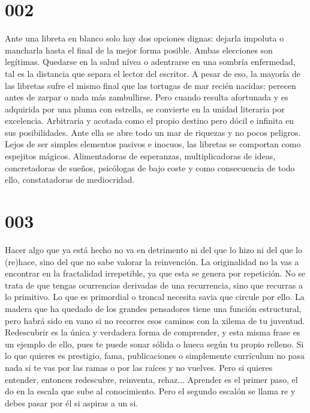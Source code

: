 \documentclass[a4paper,11pt,openright,twocolumn]{book}
\begin{document}
\section*{002}

Ante una libreta en blanco solo hay dos opciones dignas: dejarla impoluta o mancharla hasta el final de la mejor forma 
posible. Ambas elecciones son legítimas. Quedarse en la salud nívea o adentrarse en una sombría enfermedad, tal es la distancia que separa el lector del escritor. A pesar de eso, la mayoría de las libretas sufre el mismo final que las tortugas de mar recién nacidas: perecen antes de zarpar o nada más zambullirse. Pero cuando resulta afortunada y es adquirida por una pluma con estrella, se convierte en la unidad literaria por excelencia. Arbitraria y acotada como el propio destino pero dócil e infinita en sus posibilidades. Ante ella se abre todo un mar de riquezas y no pocos peligros. Lejos de ser simples elementos pasivos e inocuos, las libretas se comportan como espejitos mágicos. Alimentadoras de esperanzas, multiplicadoras de ideas, concretadoras de sueños, psicólogas de bajo coste y como consecuencia de todo ello, constatadoras de mediocridad.

\section*{003}

Hacer algo que ya está hecho no va en detrimento ni del que lo hizo ni del que lo (re)hace, sino del que no sabe valorar 
la reinvención. La originalidad no la vas a encontrar en la fractalidad irrepetible, ya que esta se genera por repetición. No se trata de que tengas ocurrencias derivadas de una recurrencia, sino que recurras a lo primitivo. Lo que es primordial o troncal necesita savia que circule por ello. La madera que ha quedado de los grandes pensadores tiene una función estructural, pero habrá sido en vano si no recorres esos caminos con la xilema de tu juventud. Redescubrir es la única y verdadera forma de comprender, y esta misma frase es un ejemplo de ello, pues te puede sonar sólida o hueca según tu propio relleno. Si lo que quieres es prestigio, fama, publicaciones o simplemente currículum no pasa nada si te vas por las ramas o por las raíces y no vuelves. Pero si quieres entender, entonces redescubre, reinventa, rehaz... Aprender es el primer paso, el do en la escala que sube al conocimiento. Pero el segundo escalón se llama re y debes pasar por él si aspiras a un si.
\end{document}
